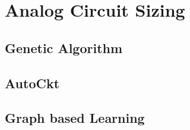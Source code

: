 
\section{Analog Circuit Sizing}
\label{sec: analog sircuit sizing}

\subsection{Genetic Algorithm}
\label{sec: genetic algorithm}

\subsection{AutoCkt}
\label{sec: automatic circuit sizing}

\subsection{Graph based Learning}
\label{sec: gnn with rl}
